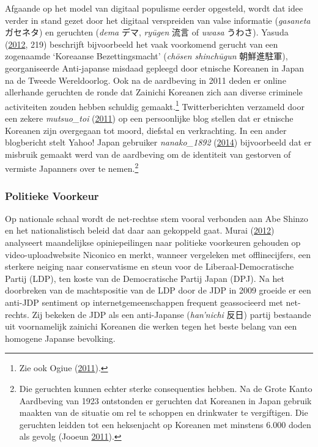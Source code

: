 \documentclass[10.5pt,dutch,]{article}
\begin{document}
Afgaande op het model van digitaal populisme eerder opgesteld, wordt dat
idee verder in stand gezet door het digitaal verspreiden van valse
informatie (\emph{gasaneta} ガセネタ) en geruchten (\emph{dema} デマ,
\emph{ryūgen} 流言 of \emph{uwasa} うわさ). Yasuda
(\protect\hyperlink{ref-yasudaux5fnettoux5f2012}{2012}, 219) beschrijft
bijvoorbeeld het vaak voorkomend gerucht van een zogenaamde `Koreaanse
Bezettingsmacht' (\emph{chōsen shinchūgun} 朝鮮進駐軍), georganiseerde
Anti-japanse misdaad gepleegd door etnische Koreanen in Japan na de
Tweede Wereldoorlog. Ook na de aardbeving in 2011 deden er online
allerhande geruchten de ronde dat Zainichi Koreanen zich aan diverse
criminele activiteiten zouden hebben schuldig gemaakt.\footnote{Zie ook
  Ogiue (\protect\hyperlink{ref-ogiueux5fkenshoux5f2011}{2011}).}
Twitterberichten verzameld door een zekere \emph{mutsuo\_toi}
(\protect\hyperlink{ref-mutsuoux5ftoiux5fhigashinihonux5f2011}{2011}) op
een persoonlijke blog stellen dat er etnische Koreanen zijn overgegaan
tot moord, diefstal en verkrachting. In een ander blogbericht stelt
Yahoo! Japan gebruiker \emph{nanako\_1892}
(\protect\hyperlink{ref-nanakoux5f1892ux5fzainichikankokujinux5f2014}{2014})
bijvoorbeeld dat er misbruik gemaakt werd van de aardbeving om de
identiteit van gestorven of vermiste Japanners over te nemen.\footnote{Die
  geruchten kunnen echter sterke consequenties hebben. Na de Grote Kanto
  Aardbeving van 1923 ontstonden er geruchten dat Koreanen in Japan
  gebruik maakten van de situatie om rel te schoppen en drinkwater te
  vergiftigen. Die geruchten leidden tot een heksenjacht op Koreanen met
  minstens 6.000 doden als gevolg (Jooeun
  \protect\hyperlink{ref-jooeunux5fgreatux5f2011}{2011}).}

\subsubsection{Politieke Voorkeur}\label{politieke-voorkeur}

Op nationale schaal wordt de net-rechtse stem vooral verbonden aan Abe
Shinzo en het nationalistisch beleid dat daar aan gekoppeld gaat. Murai
(\protect\hyperlink{ref-muraiux5fnetux5f2012}{2012}) analyseert
maandelijkse opiniepeilingen naar politieke voorkeuren gehouden op
video-uploadwebsite Niconico en merkt, wanneer vergeleken met
offlinecijfers, een sterkere neiging naar conservatisme en steun voor de
Liberaal-Democratische Partij (LDP), ten koste van de Democratische
Partij Japan (DPJ). Na het doorbreken van de machtspositie van de LDP
door de JDP in 2009 groeide er een anti-JDP sentiment op
internetgemeenschappen frequent geassocieerd met net-rechts. Zij bekeken
de JDP als een anti-Japanse (\emph{han'nichi} 反日) partij bestaande uit
voornamelijk zainichi Koreanen die werken tegen het beste belang van een
homogene Japanse bevolking.
\end{document}
